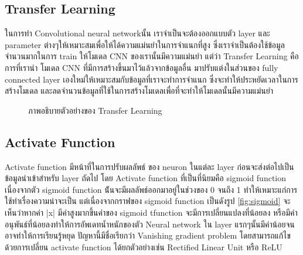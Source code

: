 \documentclass[12pt,oneside,openright,a4paper]{cpe-thai-project}
\begin{document}
\subsection{Transfer Learning\cite{Transfer}}
ในการทำ Convolutional neural networkนั้น เราจำเป็นจะต้องออกแบบตัว layer และ parameter ต่างๆให้เหมาะสมเพื่อให้ได้ความแม่นยำในการจำแนกที่สูง
ซึ่งเราจำเป็นต้องใช้ข้อมูลจำนวนมากในการ train ให้โมเดล CNN ของเรานั้นมีความแม่นยำ แต่ว่า Transfer Learning คือการที่เรานำ โมเดล CNN ที่มีการสร้างขึ้นมาไว้แล้วจากข้อมูลอื่น มาปรับแต่งในส่วนของ
fully connected layer เองใหม่ให้เหมาะสมกับข้อมูลที่เราจะทำการจำแนก ซึ่งจะทำให้ประหยัดเวลาในการสร้างโมเดล และลดจำนวนข้อมูลที่ใช้ในการสร้างโมเดลเพื่อที่จะทำให้โมเดลนั้นมีความแม่นยำ
\begin{figure}[!ht]\centering
  \setlength{\fboxrule}{0.2mm} %
  \setlength{\fboxsep}{1cm}
  \caption{ภาพอธิบายตัวอย่างของ Transfer Learning}\label{fig:transfer}
\end{figure}

\newpage 
\subsection{Activate Function\cite{Activate}}
Activate function มีหน้าที่ในการปรับผลลัพธ์ ของ neuron ในแต่ละ layer ก่อนจะส่งต่อไปเป็นข้อมูลนำเข้าสำหรับ layer ถัดไป โดย Activate function ที่เป็นที่นิยมคือ sigmoid function เนื่องจากตัว sigmoid function 
น้ันจะมีผลลัพธ์ออกมาอยู่ในช่วงของ 0 จนถึง 1 ทำให้เหมาะแก่การใช้ทำเรื่องความน่าจะเป็น แต่เนื่องจากกราฟของ sigmoid function เป็นดังรูป \ref{fig:sigmoid}  จะเห็นว่าหากค่า |x| มีค่าสูงมากขึ้นค่าของ sigmoid tfunction จะมีการเปลี่ยนแปลงที่น้อยลง 
หรือมีค่าอนุพันธ์ที่น้อยลงทำให้การอัพเดทน้ำหนักของตัว Neural network ใน layer แรกๆนั้นมีค่าน้อยจนอาจทำให้การเรียนรู้หยุด  
ปัญหานี้มีชื่อเรียกว่า Vanishing gradient problem โดยสามารถแก้ไขด้วยการเปลี่ยน activate function ได้ยกตัวอย่างเช่น Rectified Linear Unit หรือ ReLU
\end{document}
